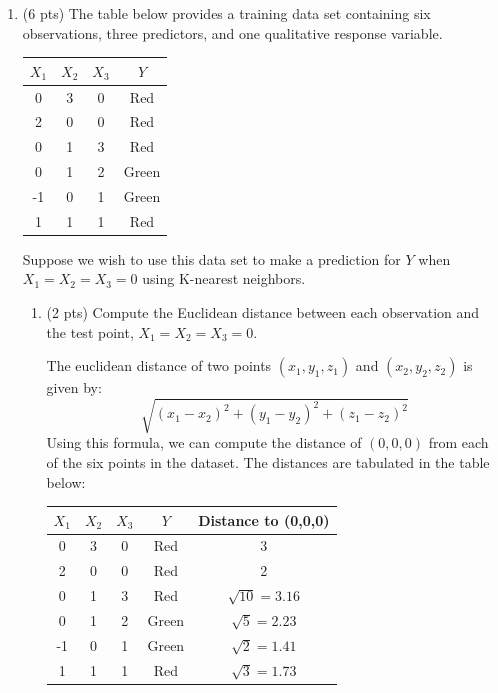 \documentclass[a4paper]{article}
\theoremstyle{definition}
\newenvironment{soln}{
    \leavevmode\color{blue}\ignorespaces
}{}
\begin{document}
\begin{enumerate}
\begin{enumerate}
\end{enumerate}

\item (6 pts) The table below provides a training data set containing six observations, three predictors, and one qualitative response variable.

\begin{center}
	\begin{tabular}{ c  c  c  c}
		\hline
		$X_{1}$ & $X_{2}$ & $X_{3}$ & $Y$ \\ \hline
		0 & 3 & 0 & Red \\
		2 & 0 & 0 & Red \\
		0 & 1 & 3 & Red \\
		0 & 1 & 2 & Green \\
		-1 & 0 & 1 & Green \\
		1 & 1 & 1 & Red  \\
		\hline
	\end{tabular}
\end{center}

Suppose we wish to use this data set to make a prediction for $Y$ when $X_{1} = X_{2} = X_{3} = 0$ using K-nearest neighbors.

\begin{enumerate}
	\item (2 pts) Compute the Euclidean distance between each observation and the test point, $X_{1} = X_{2} = X_{3}=0$.
 
	\begin{soln}  The euclidean distance of two points $(x_1,y_1,z_1)$ and $(x_2,y_2,z_2)$ is given by: $$\sqrt{(x_1-x_2)^2 + (y_1-y_2)^2 + (z_1-z_2)^2}$$
    Using this formula, we can compute the distance of $(0,0,0)$ from each of the six points in the dataset. The distances are tabulated in the table below: 
    \begin{table}[hbt!]
    \centering
    \begin{tabular}{ccccc}
    \hline
    $X_{1}$ & $X_{2}$ & $X_{3}$ & $Y$ & Distance to (0,0,0) \\ \hline
    0 & 3 & 0 & Red & 3 \\
    2 & 0 & 0 & Red & 2 \\
    0 & 1 & 3 & Red & $\sqrt{10}=3.16$ \\
    0 & 1 & 2 & Green & $\sqrt{5}=2.23$ \\
    -1 & 0 & 1 & Green & $\sqrt{2}=1.41$ \\
    1 & 1 & 1 & Red & $\sqrt{3}=1.73$ \\ \hline
    \end{tabular}
    \end{table}
    

\end{soln}
\end{enumerate}
\end{enumerate}
\end{document}
